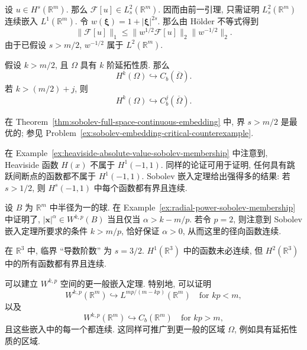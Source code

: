 \begin{Proof}
设 $u\in H^s(\mathbb{R}^m)$. 那么 $\mathcal{F}[u]\in L_s^2(\mathbb{R}^m)$. 因而由前一引理, 只需证明 $L_s^2(\mathbb{R}^m)$ 连续嵌入 $L^1(\mathbb{R}^m)$. 令 $w(\bm{\xi})=1+|\bm{\xi}|^{2s}$. 那么由 Hölder 不等式得到
\begin{equation}\label{eq:sobolev-embedding-fourier-holder-weight}
\|\mathcal{F}[u]\|_1\leq\|w^{1/2}\mathcal{F}[u]\|_2\|w^{-1/2}\|_2.
\end{equation}
由于已假设 $s>m/2$, $w^{-1/2}$ 属于 $L^2(\mathbb{R}^m)$.
\end{Proof}

\begin{Corollary}
\label{cor:sobolev-extension-continuity}
假设 $k>m/2$, 且 $\Omega$ 具有 $k$ 阶延拓性质. 那么\[H^k(\Omega)\hookrightarrow C_b(\overline\Omega).\]若 $k>(m/2)+j$, 则\[H^k(\Omega)\hookrightarrow C_b^j(\overline\Omega).\]
\end{Corollary}

\begin{Remark}
\label{rem:sobolev-embedding-optimal-threshold}
在 Theorem~\ref{thm:sobolev-full-space-continuous-embedding} 中, 界 $s>m/2$ 是最优的; 参见 Problem~\ref{ex:sobolev-embedding-critical-counterexample}.
\end{Remark}

\begin{Example}
\label{ex:sobolev-jump-discontinuity}
在 Example~\ref{ex:heaviside-absolute-value-sobolev-membership} 中注意到, Heaviside 函数 $H(x)$ 不属于 $H^1(-1,1)$. 同样的论证可用于证明, 任何具有跳跃间断点的函数都不属于 $H^1(-1,1)$. Sobolev 嵌入定理给出强得多的结果: 若 $s>1/2$, 则 $H^s(-1,1)$ 中每个函数都有界且连续.
\end{Example}

\begin{Example}
\label{ex:sobolev-radial-power-embedding}
设 $B$ 为 $\mathbb{R}^m$ 中半径为一的球. 在 Example~\ref{ex:radial-power-sobolev-membership} 中证明了, $|\bm{x}|^\alpha\in W^{k,p}(B)$ 当且仅当 $\alpha>k-m/p$. 若令 $p=2$, 则注意到 Sobolev 嵌入定理所要求的条件 $k>m/p$, 恰好保证 $\alpha>0$, 从而这里的径向函数连续.
\end{Example}

\begin{Example}
\label{ex:sobolev-three-dimensional-critical-order}
在 $\mathbb{R}^3$ 中, 临界 ``导数阶数'' 为 $s=3/2$. $H^1(\mathbb{R}^3)$ 中的函数未必连续, 但 $H^2(\mathbb{R}^3)$ 中的所有函数都有界且连续.
\end{Example}

\begin{Remark}
\label{rem:sobolev-general-p-embeddings}
可以建立 $W^{k,p}$ 空间的更一般嵌入定理. 特别地, 可以证明\[W^{k,p}(\mathbb{R}^m)\hookrightarrow L^{mp/(m-kp)}(\mathbb{R}^m)\quad\text{for }kp<m,\]以及\[W^{k,p}(\mathbb{R}^m)\hookrightarrow C_b(\mathbb{R}^m)\quad\text{for }kp>m,\]且这些嵌入中的每一个都连续. 这同样可推广到更一般的区域 $\Omega$, 例如具有延拓性质的区域.
\end{Remark}
